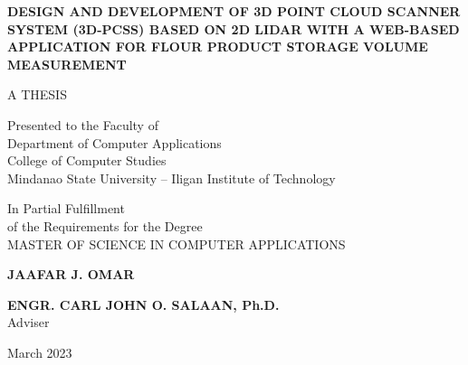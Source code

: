 \documentclass[a4paper, 12pt]{report}
\begin{document}
\begin{titlepage}
	\setlength{\topmargin}{-40pt}
	\setlength{\textheight}{664pt}
	\begin{singlespace}
		\begin{center}
			\textbf{\MakeUppercase{Design and Development of 3D Point Cloud Scanner System (3D-PCSS) based on 2D LiDAR With A Web-based Application for Flour Product Storage Volume Measurement}}
			\vspace{2.50cm}

			\MakeUppercase{A THESIS}

			\vspace{2.0cm}

			Presented to the Faculty of\\
			Department of Computer Applications\\
			College of Computer Studies \\
			Mindanao State University -- Iligan Institute of Technology

			\vspace{2.0cm}


			In Partial Fulfillment\\
			of the Requirements for the Degree\\
			MASTER OF SCIENCE IN COMPUTER APPLICATIONS

			\vspace{2.25cm}

			\textbf{JAAFAR J. OMAR}

			\vspace{3.0cm}

			\textbf{ENGR. CARL JOHN O. SALAAN, Ph.D.} \\
			Adviser
			\vspace{2.0cm}

			March 2023

		\end{center}
	\end{singlespace}
\end{titlepage}

\tableofcontents
\listoffigures
\listoftables








\end{document}

